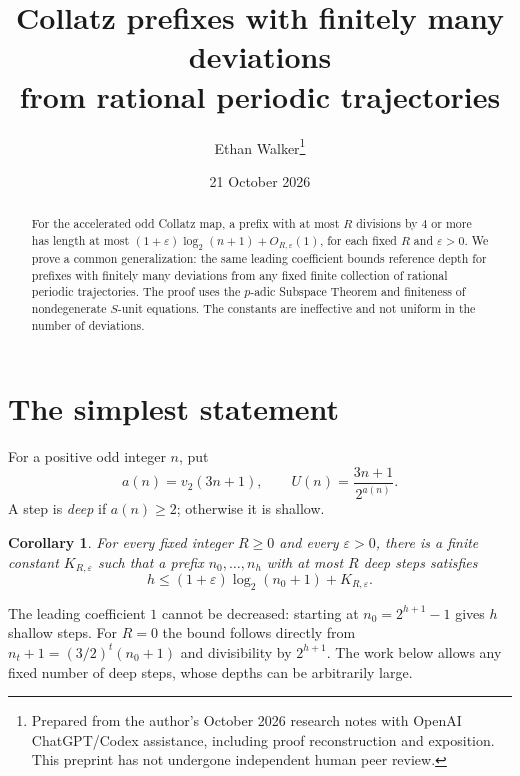 \documentclass[11pt]{article}
\title{Collatz prefixes with finitely many deviations\\from rational periodic trajectories}
\author{Ethan Walker\thanks{Prepared from the author's October 2026 research notes with OpenAI ChatGPT/Codex assistance, including proof reconstruction and exposition. This preprint has not undergone independent human peer review.}}
\date{21 October 2026}
\newtheorem{corollary}[theorem]{Corollary}
\begin{document}
\maketitle
\begin{abstract}
For the accelerated odd Collatz map, a prefix with at most $R$ divisions by $4$ or more has length at most $(1+\varepsilon)\log_2(n+1)+O_{R,\varepsilon}(1)$, for each fixed $R$ and $\varepsilon>0$. We prove a common generalization: the same leading coefficient bounds reference depth for prefixes with finitely many deviations from any fixed finite collection of rational periodic trajectories. The proof uses the $p$-adic Subspace Theorem and finiteness of nondegenerate $S$-unit equations. The constants are ineffective and not uniform in the number of deviations.
\end{abstract}
\section{The simplest statement}
For a positive odd integer $n$, put
\[
a(n)=v_2(3n+1),\qquad U(n)=\frac{3n+1}{2^{a(n)}}.
\]
A step is \emph{deep} if $a(n)\ge2$; otherwise it is shallow.
\begin{corollary}\label{fixed}
For every fixed integer $R\ge0$ and every $\varepsilon>0$, there is a finite constant $K_{R,\varepsilon}$ such that a prefix
$n_0,\ldots,n_h$ with at most $R$ deep steps satisfies
\[
h\le(1+\varepsilon)\log_2(n_0+1)+K_{R,\varepsilon}.
\]
\end{corollary}
The leading coefficient $1$ cannot be decreased: starting at
$n_0=2^{h+1}-1$ gives $h$ shallow steps. For $R=0$ the bound follows directly from
$n_t+1=(3/2)^t(n_0+1)$ and divisibility by $2^{h+1}$.
The work below allows any fixed number of deep steps, whose depths can be arbitrarily large.
\end{document}
